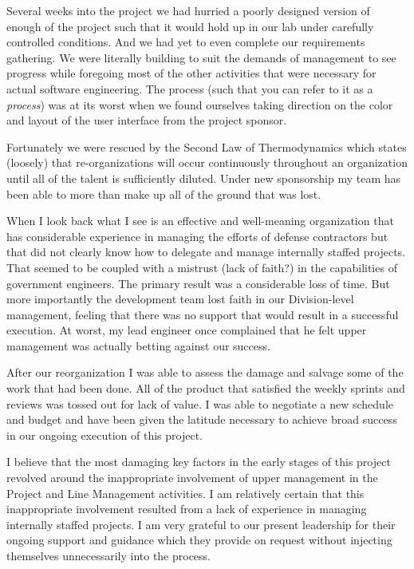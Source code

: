 \documentclass[letterpaper,12pt]{article}
\begin{document}
Several weeks into the project we had hurried a poorly designed version of enough of the project such that it would hold up in our lab under carefully controlled conditions. And we had yet to even complete our requirements gathering.  We were literally building to suit the demands of management to see progress while foregoing most of the other activities that were necessary for actual software engineering.  The process (such that you can refer to it as a \emph{process}) was at its worst when we found ourselves taking direction on the color and layout of the user interface from the project sponsor.

Fortunately we were rescued by the Second Law of Thermodynamics which states (loosely) that re-organizations will occur continuously throughout an organization until all of the talent is sufficiently diluted.  Under new sponsorship my team has been able to more than make up all of the ground that was lost.

When I look back what I see is an effective and well-meaning organization that has considerable experience in managing the efforts of defense contractors but that did not clearly know how to delegate and manage internally staffed projects.  That seemed to be coupled with a mistrust (lack of faith?) in the capabilities of government engineers.  The primary result was a considerable loss of time.  But more importantly the development team lost faith in our Division-level management, feeling that there was no support that would result in a successful execution.  At worst, my lead engineer once complained that he felt upper management was actually betting against our success.

After our reorganization I was able to assess the damage and salvage some of the work that had been done.  All of the product that satisfied the weekly sprints and reviews was tossed out for lack of value.  I was able to negotiate a new schedule and budget and have been given the latitude necessary to achieve broad success in our ongoing execution of this project.

I believe that the most damaging key factors in the early stages of this project revolved around the inappropriate involvement of upper management in the Project and Line Management activities.  I am relatively certain that this inappropriate involvement resulted from a lack of experience in managing internally staffed projects.  I am very grateful to our present leadership for their ongoing support and guidance which they provide on request without injecting themselves unnecessarily into the process.
\end{document}
